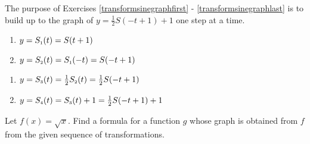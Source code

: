 \documentclass{ximera}
\begin{document}
The purpose of Exercises \ref{transformsinegraphfirst} - \ref{transformsinegraphlast} is to build up to the graph  of $y = \frac{1}{2}S(-t+1) + 1$  one step at a time.

\begin{multicols}{2}
\begin{enumerate}
\setcounter{enumi}{\value{HW}}

\item $y = S_{\text{\tiny $1$}}(t) = S(t + 1)$ \label{transformsinegraphfirst}
\item  $y = S_{\text{\tiny $2$}}(t) =  S_{\text{\tiny $1$}}(-t) = S(-t + 1)$

\setcounter{HW}{\value{enumi}}
\end{enumerate}
\end{multicols}

\begin{multicols}{2}
\begin{enumerate}
\setcounter{enumi}{\value{HW}}

\item  $y = S_{\text{\tiny $3$}}(t) = \frac{1}{2}  S_{\text{\tiny $2$}}(t) =  \frac{1}{2}S(-t+1)$
\item  $y = S_{\text{\tiny $4$}}(t) = S_{\text{\tiny $3$}}(t) + 1 = \frac{1}{2}S(-t+1) + 1$ \label{transformsinegraphlast}

\setcounter{HW}{\value{enumi}}
\end{enumerate}
\end{multicols}

Let $f(x) = \sqrt{x}$.  Find a formula for a function $g$ whose graph is obtained from $f$ from the given sequence of transformations. 
\end{document}
